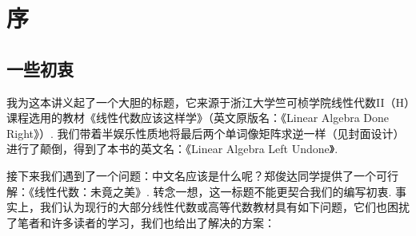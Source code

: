 \chapter*{序}

\section*{一些初衷}

我为这本讲义起了一个大胆的标题，它来源于浙江大学竺可桢学院线性代数II（H）课程选用的教材《线性代数应该这样学》（英文原版名：《Linear Algebra Done Right》）. 我们带着半娱乐性质地将最后两个单词像矩阵求逆一样（见封面设计）进行了颠倒，得到了本书的英文名：《Linear Algebra Left Undone》.

接下来我们遇到了一个问题：中文名应该是什么呢？郑俊达同学提供了一个可行解：《线性代数：未竟之美》. 转念一想，这一标题不能更契合我们的编写初衷. 事实上，我们认为现行的大部分线性代数或高等代数教材具有如下问题，它们也困扰了笔者和许多读者的学习，我们也给出了解决的方案：

